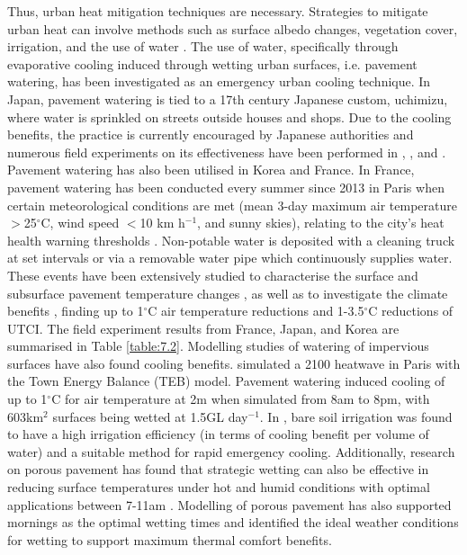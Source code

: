 \documentclass[final,3p,times,authoryear]{elsarticle}
\begin{document}
Thus, urban heat mitigation techniques are necessary. Strategies to mitigate urban heat can involve methods such as surface albedo changes, vegetation cover, irrigation, and the use of water \citep{Krayenhoff2021}. The use of water, specifically through evaporative cooling induced through wetting urban surfaces, i.e. pavement watering, has been investigated as an emergency urban cooling technique. In Japan, pavement watering is tied to a 17th century Japanese custom, uchimizu, where water is sprinkled on streets outside houses and shops. Due to the cooling benefits, the practice is currently encouraged by Japanese authorities \citep{Solcerova2018} and numerous field experiments on its effectiveness have been performed in \cite{Kinouchi1997}, \cite{Himeno2010}, and \cite{Takebayashi2021,Takebayashi2022,Takebayashi2023}. Pavement watering has also been utilised in Korea \citep{Kim2014a,Kim2015,Na2021} and France. In France, pavement watering has been conducted every summer since 2013 in Paris when certain meteorological conditions are met (mean 3-day maximum air temperature $>$25$^{\circ}$C, wind speed $<$10 km h$^{-1}$, and sunny skies), relating to the city's heat health warning thresholds \citep{Pascal2006}. Non-potable water is deposited with a cleaning truck at set intervals or via a removable water pipe which continuously supplies water. These events have been extensively studied to characterise the surface and subsurface pavement temperature changes \citep{Hendel2015,Hendel2015a,Hendel2015b,Hendel2014}, as well as to investigate the climate benefits \citep{Hendel2016,Parison2020}, finding up to 1$^{\circ}$C air temperature reductions and 1-3.5$^{\circ}$C reductions of UTCI. The field experiment results from France, Japan, and Korea are summarised in Table \ref{table:7.2}. Modelling studies of watering of impervious surfaces have also found cooling benefits. \cite{Daniel2018} simulated a 2100 heatwave in Paris with the Town Energy Balance (TEB) model. Pavement watering induced cooling of up to 1$^{\circ}$C for air temperature at 2m when simulated from 8am to 8pm, with 603km$^{2}$ surfaces being wetted at 1.5GL day$^{-1}$. In \cite{Broadbent2018b}, bare soil irrigation was found to have a high irrigation efficiency (in terms of cooling benefit per volume of water) and a suitable method for rapid emergency cooling. Additionally, research on porous pavement has found that strategic wetting can also be effective in reducing surface temperatures under hot and humid conditions with optimal applications between 7-11am \citep{Wang2022d}. Modelling of porous pavement has also supported mornings as the optimal wetting times \citep{Kubilay2021} and identified the ideal weather conditions \citep{Liu2022b} for wetting to support maximum thermal comfort benefits.
\end{document}
